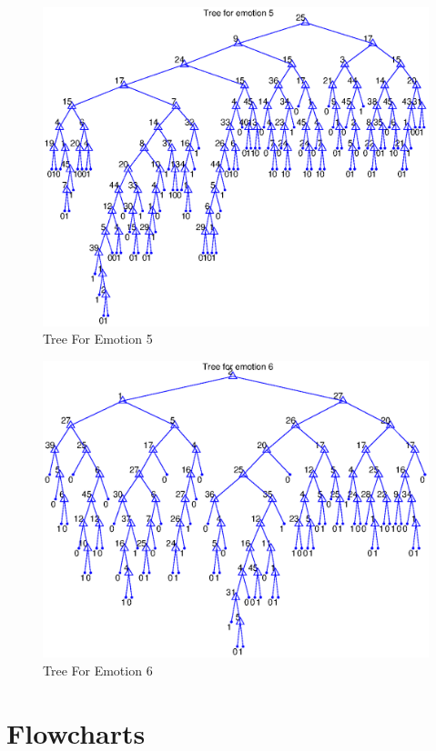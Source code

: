 \documentclass[11pt,a4paper]{article}
\begin{document}
\begin{figure}[!hb]
	\centering
	\includegraphics[width=\textwidth]{trees/tree5.eps}
     \caption{Tree For Emotion 5}
     \label{fig:tree5}
\end{figure}
\begin{figure}[!ht]
	\centering
	\includegraphics[width=\textwidth]{trees/tree6.eps}
     \caption{Tree For Emotion 6}
     \label{fig:tree6}
\end{figure}

\section{Flowcharts}
\end{document}
